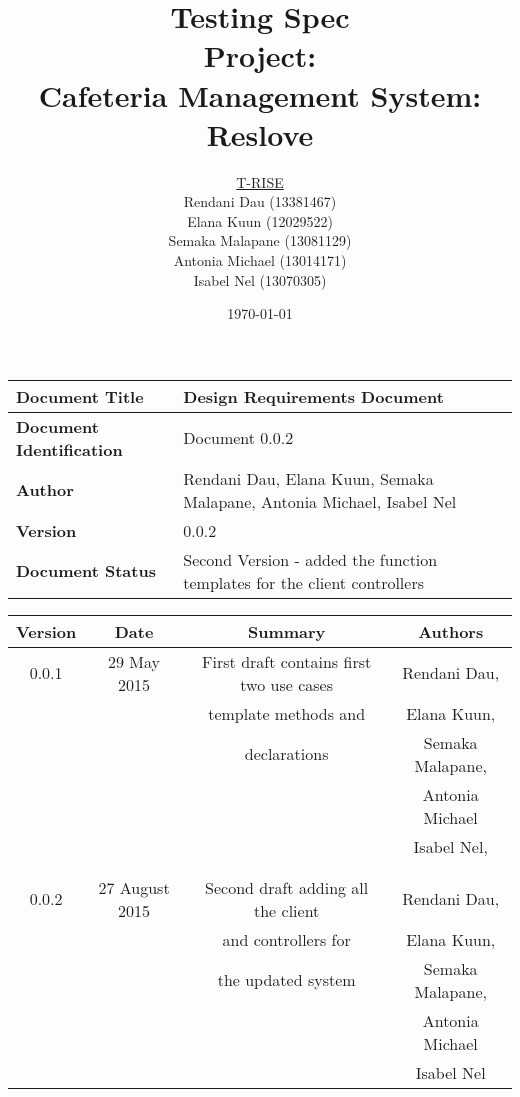 \documentclass[a4paper,12pt]{article}
\begin{document}
\title{\Huge Testing Spec\\ 
	 Project: \\ 
	Cafeteria Management System: Reslove}
\author{
         \underline{T-RISE}\\
          Rendani Dau (13381467) \\
	Elana Kuun (12029522) \\
	Semaka Malapane (13081129) \\
	Antonia Michael (13014171) \\
	Isabel Nel (13070305)}

\date{\today}
 

\maketitle
\break

\tableofcontents
\break

\begin{tabu} to 0.8\textwidth { | X[l] | X[l] | }
 \hline
\textbf{Document Title} & Design Requirements Document \\
 \hline
 \textbf{Document Identification}  & Document 0.0.2 \\
\hline
 \textbf{Author}  & Rendani Dau, Elana Kuun, Semaka Malapane, Antonia Michael, Isabel Nel \\
\hline
\textbf{Version} & 0.0.2 \\
\hline
\textbf{Document Status} & Second Version - added the function templates for the client controllers \\
\hline
\end{tabu}

\begin{table}[h!]
\centering
 \begin{tabular}{||c c c c||} 
 \hline
 \textbf{Version} & \textbf{Date} & \textbf{Summary} & \textbf{Authors} \\ [0.5ex] 
 \hline\hline
 0.0.1 & 29 May 2015 &  First draft contains first two use cases  & Rendani Dau, \\ & & template methods and  & Elana Kuun, \\ & &  declarations& Semaka Malapane, \\ & & & Antonia Michael \\ & & & Isabel Nel, \\ & & & \\
 \hline 
 & & & \\
 0.0.2 & 27 August 2015 &  Second draft adding all the client & Rendani Dau, \\ & & and controllers for & Elana Kuun, \\ & & the updated system & Semaka Malapane, \\ & & &  Antonia Michael \\ & & & Isabel Nel \\   [1ex] 
 \hline  
 \end{tabular}
\end{table}
\end{document}
